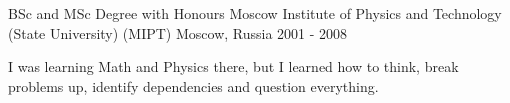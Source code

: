 

\begin{cventries}

  \cventry
    {BSc and MSc Degree with Honours} %
    {Moscow Institute of Physics and Technology (State University) (MIPT)} %
    {Moscow, Russia} %
    {2001 - 2008} %
    {
      \begin{cvitems} %
        \item {I was learning Math and Physics there, but I learned how to think, break problems up, identify dependencies and question everything.}
      \end{cvitems}
    }

\end{cventries}
